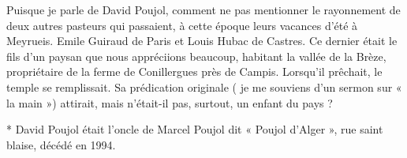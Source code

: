 Puisque je parle de David Poujol, comment ne pas mentionner le rayonnement de
deux autres pasteurs qui passaient, à cette époque leurs vacances d’été à Meyrueis.
Emile Guiraud de Paris et Louis Hubac de Castres. Ce dernier était le fils d’un paysan
que nous appréciions beaucoup, habitant la vallée de la Brèze, propriétaire de la
ferme de Conillergues près de Campis. Lorsqu’il prêchait, le temple se remplissait.
Sa prédication originale ( je me souviens d’un sermon sur « la main ») attirait, mais
n’était-il pas, surtout, un enfant du pays ?

\begin{footnotesize}
* David Poujol était l’oncle de Marcel Poujol dit « Poujol d’Alger », rue saint blaise, décédé en 1994.
\end{footnotesize}
